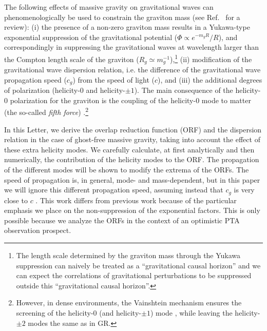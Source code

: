 \documentclass[prd,twocolumn,aps,psfig,nofootinbib,nobibnotes,superscriptaddress,preprintnumbers,times]{revtex4-2}
\begin{document}
The following effects of massive gravity on gravitational waves can phenomenologically be used to constrain the graviton mass (see Ref.\ \cite{deRham:2016nuf} for a review):
(i) the presence of a non-zero graviton mass results in a Yukawa-type exponential suppression of the gravitational potential ($\Phi \propto e^{-m_gR}/R$), and correspondingly in suppressing the gravitational waves at wavelength larger than the Compton length scale of the graviton ($R_g \simeq m_g^{-1}$),\footnote{The length scale determined by the graviton mass through the Yukawa suppression can naively be treated as a ``gravitational causal horizon'' and we can expect the correlations of gravitational perturbations to be suppressed outside this ``gravitational causal horizon''.}
(ii) modification of the gravitational wave dispersion relation, i.e. the difference of the gravitational wave propagation speed ($c_g$) from the speed of light ($c$), and
(iii) the additional degrees of polarization (helicity-$0$ and helicity-$\pm 1$). The main consequence of the helicity-$0$ polarization for the graviton is the coupling of the helicity-0 mode to matter (the so-called {\it fifth force}) \cite{deRham:2014naa}.\footnote{{However, in dense environments, the Vainshtein mechanism \cite{Vainshtein:1972sx} ensures the screening of the helicity-0 (and helicity-$\pm 1$) mode \cite{deRham:2012fw,
Bloomfield:2014zfa,Falck:2015rsa,Falck:2014jwa,Kase:2015zva,Koyama:2015oma}, while leaving the helicity-$\pm 2$ modes the same as in GR.}}

In this Letter, we derive the overlap reduction function (ORF) and the dispersion relation in the case of ghost-free massive gravity, taking into account the effect of these extra helicity modes. We carefully calculate, at first analytically and then numerically, the contribution of the helicity modes to the ORF. The propagation of the different modes will be shown to modify the extrema of the ORFs. The speed of propagation is, in general, mode- and mass-dependent, but in this paper we will ignore this different propagation speed, assuming instead that $c_g$ is very close to $c$ \cite{Blas:2016qmn}. This work differs from previous work \cite{Liang:2021bct, Anholm:2008wy, Arjona:2024cex, Lee:2013awh} because of the particular emphasis we place on the non-suppression of the exponential factors. This is only possible because we analyze the ORFs in the context of an optimistic PTA observation prospect.
\end{document}
